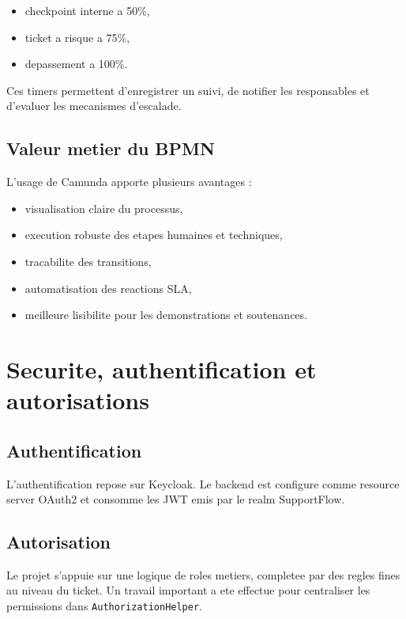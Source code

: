 \documentclass[12pt,a4paper]{article}
\begin{document}
\begin{itemize}[leftmargin=1.2cm]
  \item checkpoint interne a 50\%,
  \item ticket a risque a 75\%,
  \item depassement a 100\%.
\end{itemize}

Ces timers permettent d'enregistrer un suivi, de notifier les responsables et d'evaluer les mecanismes d'escalade.

\subsection{Valeur metier du BPMN}

L'usage de Camunda apporte plusieurs avantages :

\begin{itemize}[leftmargin=1.2cm]
  \item visualisation claire du processus,
  \item execution robuste des etapes humaines et techniques,
  \item tracabilite des transitions,
  \item automatisation des reactions SLA,
  \item meilleure lisibilite pour les demonstrations et soutenances.
\end{itemize}

\section{Securite, authentification et autorisations}

\subsection{Authentification}

L'authentification repose sur Keycloak. Le backend est configure comme resource server OAuth2 et consomme les JWT emis par le realm SupportFlow.

\subsection{Autorisation}

Le projet s'appuie sur une logique de roles metiers, completee par des regles fines au niveau du ticket. Un travail important a ete effectue pour centraliser les permissions dans \texttt{AuthorizationHelper}.
\end{document}
